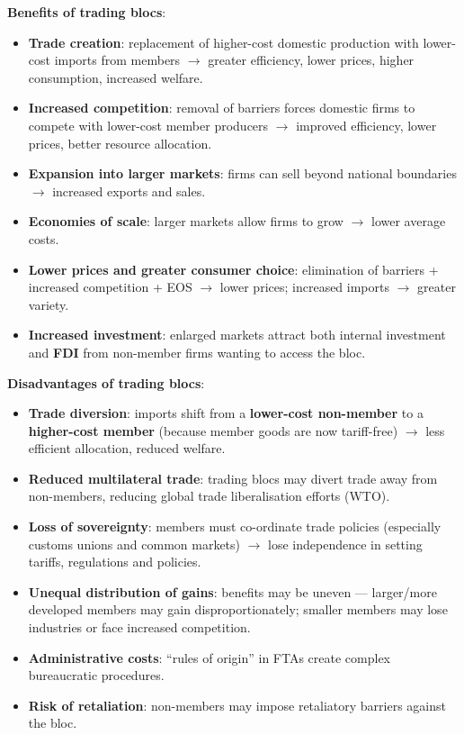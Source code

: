 \documentclass[a4paper,12pt]{article}
\begin{document}
\textbf{Benefits of trading blocs}:
\begin{itemize}
  \item \textbf{Trade creation}: replacement of higher-cost domestic production with lower-cost imports from members $\to$ greater efficiency, lower prices, higher consumption, increased welfare.
  \item \textbf{Increased competition}: removal of barriers forces domestic firms to compete with lower-cost member producers $\to$ improved efficiency, lower prices, better resource allocation.
  \item \textbf{Expansion into larger markets}: firms can sell beyond national boundaries $\to$ increased exports and sales.
  \item \textbf{Economies of scale}: larger markets allow firms to grow $\to$ lower average costs.
  \item \textbf{Lower prices and greater consumer choice}: elimination of barriers + increased competition + EOS $\to$ lower prices; increased imports $\to$ greater variety.
  \item \textbf{Increased investment}: enlarged markets attract both internal investment and \textbf{FDI} from non-member firms wanting to access the bloc.
\end{itemize}
\textbf{Disadvantages of trading blocs}:
\begin{itemize}
  \item \textbf{Trade diversion}: imports shift from a \textbf{lower-cost non-member} to a \textbf{higher-cost member} (because member goods are now tariff-free) $\to$ less efficient allocation, reduced welfare.
  \item \textbf{Reduced multilateral trade}: trading blocs may divert trade away from non-members, reducing global trade liberalisation efforts (WTO).
  \item \textbf{Loss of sovereignty}: members must co-ordinate trade policies (especially customs unions and common markets) $\to$ lose independence in setting tariffs, regulations and policies.
  \item \textbf{Unequal distribution of gains}: benefits may be uneven --- larger/more developed members may gain disproportionately; smaller members may lose industries or face increased competition.
  \item \textbf{Administrative costs}: ``rules of origin'' in FTAs create complex bureaucratic procedures.
  \item \textbf{Risk of retaliation}: non-members may impose retaliatory barriers against the bloc.
\end{itemize}
\end{document}
